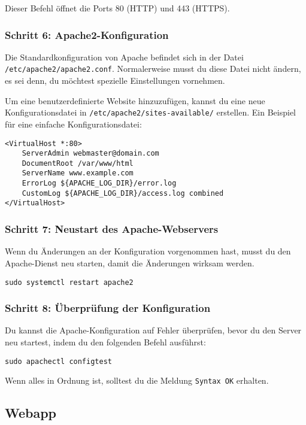 \documentclass[a4paper,12pt]{article}
\begin{document}
Dieser Befehl öffnet die Ports 80 (HTTP) und 443 (HTTPS).

\subsubsection{Schritt 6: Apache2-Konfiguration}
Die Standardkonfiguration von Apache befindet sich in der Datei \texttt{/etc/apache2/apache2.conf}. Normalerweise musst du diese Datei nicht ändern, es sei denn, du möchtest spezielle Einstellungen vornehmen.

Um eine benutzerdefinierte Website hinzuzufügen, kannst du eine neue Konfigurationsdatei in \texttt{/etc/apache2/sites-available/} erstellen. Ein Beispiel für eine einfache Konfigurationsdatei:

\begin{lstlisting}
<VirtualHost *:80>
    ServerAdmin webmaster@domain.com
    DocumentRoot /var/www/html
    ServerName www.example.com
    ErrorLog ${APACHE_LOG_DIR}/error.log
    CustomLog ${APACHE_LOG_DIR}/access.log combined
</VirtualHost>
\end{lstlisting}

\subsubsection{Schritt 7: Neustart des Apache-Webservers}
Wenn du Änderungen an der Konfiguration vorgenommen hast, musst du den Apache-Dienst neu starten, damit die Änderungen wirksam werden.

\begin{lstlisting}
sudo systemctl restart apache2
\end{lstlisting}

\subsubsection{Schritt 8: Überprüfung der Konfiguration}
Du kannst die Apache-Konfiguration auf Fehler überprüfen, bevor du den Server neu startest, indem du den folgenden Befehl ausführst:

\begin{lstlisting}
sudo apachectl configtest
\end{lstlisting}

Wenn alles in Ordnung ist, solltest du die Meldung \texttt{Syntax OK} erhalten.

\subsection{Webapp}
\end{document}
